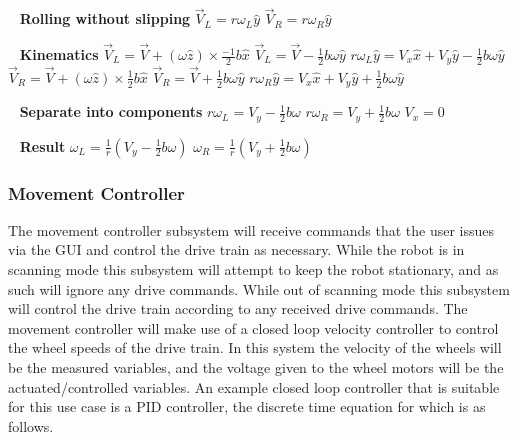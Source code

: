 \documentclass[12pt]{article}
\begin{document}
\ \newline
\textbf{Rolling without slipping}
\newline $\vec{V}_L = r\omega_L\hat{y}$
\newline $\vec{V}_R = r\omega_R\hat{y}$

\ \newline
\textbf{Kinematics}
\newline $\vec{V}_L = \vec{V} + (\omega\hat{z}) \times \frac{-1}{2}b\hat{x}$
\newline $\vec{V}_L = \vec{V} - \frac{1}{2}b\omega\hat{y}$
\newline $r\omega_L\hat{y} = V_x\hat{x} + V_y\hat{y} - \frac{1}{2}b\omega\hat{y}$
\newline $\vec{V}_R = \vec{V} + (\omega\hat{z}) \times \frac{1}{2}b\hat{x}$
\newline $\vec{V}_R = \vec{V} + \frac{1}{2}b\omega\hat{y}$
\newline $r\omega_R\hat{y} = V_x\hat{x} + V_y\hat{y} + \frac{1}{2}b\omega\hat{y}$

\ \newline
\textbf{Separate into components}
\newline $r\omega_L = V_y - \frac{1}{2}b\omega$
\newline $r\omega_R = V_y + \frac{1}{2}b\omega$
\newline $V_x = 0$

\ \newline
\textbf{Result}
\newline $\omega_L = \frac{1}{r} (V_y - \frac{1}{2}b\omega)$
\newline $\omega_R = \frac{1}{r} (V_y + \frac{1}{2}b\omega)$

\subsubsection{Movement Controller}
The movement controller subsystem will receive commands that the user issues via the GUI and control the
drive train as necessary.
\newline\newline
While the robot is in scanning mode this subsystem will attempt to keep the robot stationary, and as such
will ignore any drive commands. While out of scanning mode this subsystem will control the drive train
according to any received drive commands.
\newline\newline
The movement controller will make use of a closed loop velocity controller to control the wheel speeds of
the drive train. In this system the velocity of the wheels will be the measured variables, and the voltage
given to the wheel motors will be the actuated/controlled variables. An example closed loop controller that
is suitable for this use case is a PID controller, the discrete time equation for which is as follows.
\end{document}
